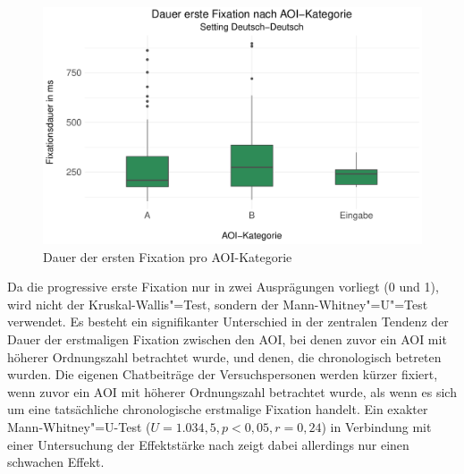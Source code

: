 

\begin{figure}[H]
    \includegraphics[width=.85\textwidth]{Figures/EyeTracking/DD/ggplot_DD-FFDur_AOI_de}
	\caption{Dauer der ersten Fixation pro AOI-Kategorie
             \label{K6:fig:DD:FFDur-AOI-boxplot}}
\end{figure}\vfill\pagebreak


Da die progressive erste Fixation nur in zwei Ausprägungen vorliegt (0 und 1), wird nicht der Kruskal-Wallis"=Test, sondern der Mann-Whitney"=U"=Test verwendet. Es besteht ein signifikanter Unterschied in der zentralen Tendenz der Dauer der erstmaligen Fixation zwischen den AOI, bei denen zuvor ein AOI mit höherer Ordnungszahl betrachtet wurde, und denen, die chronologisch betreten wurden. Die eigenen Chatbeiträge der Versuchspersonen werden kürzer fixiert, wenn zuvor ein AOI mit höherer Ordnungszahl betrachtet wurde, als wenn es sich um eine tatsächliche chronologische erstmalige Fixation handelt. Ein exakter Mann-Whitney"=U-Test ($U = 1.034,5, p < 0,05, r = 0,24$) in Verbindung mit einer Untersuchung der Effektstärke nach \citet{cohen_power_1992} zeigt dabei allerdings nur einen schwachen Effekt.




